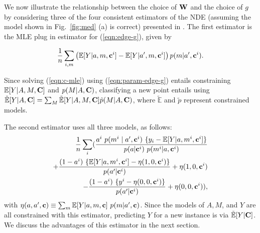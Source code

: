 \documentclass[letterpaper]{article} %
\newcommand{\citep}{\cite}
\begin{document}
We now illustrate the relationship between the choice of ${\bf W}$ and the choice of $g$ by considering three of the four consistent estimators of the NDE (assuming the model shown in Fig.~\ref{fig:med} (a) is correct) presented in \citep{tchetgen12semi2}.  The first estimator is the MLE plug in estimator for (\ref{eqn:edge-g}), given by
\begin{small}
\begin{align}
\frac{1}{n} \sum_{i,m} \left( \mathbb{E}[Y | a,m,{\bf c}^i
] - \mathbb{E}[Y | a',m,{\bf c}^i%
] \right) %
p(m | a',{\bf c}^i%
). 
\label{eqn:param-edge-g}
\end{align}
\end{small}
Since solving (\ref{eqn:c-mle}) using (\ref{eqn:param-edge-g}) entails constraining $\mathbb{E}[Y | A, M, {\bf C}]$ and $p(M | A, {\bf C})$, classifying a new point entails using
$\tilde{\mathbb{E}}[Y | A,{\bf C}%
] = \sum_M \tilde{\mathbb{E}}[Y | A,M,{\bf C}%
] \tilde{p}(M | A,{\bf C}%
)$, where $\tilde{\mathbb{E}}$ and $\tilde{p}$ represent constrained models.

The second estimator uses all three models, as follows:
{\footnotesize
\begin{align}
\notag
\label{eqn:3-robust}
\frac{1}{n} \sum_i (
\frac{ a^i \ p(m^i \mid a',{\bf c}^i) \ \{ y_i - \mathbb{E}[Y | a,m^i,{\bf c}^i ] \}
}{ p(a|{\bf c}^i) \
	p(m^i | a,{\bf c}^i)}\\
\notag
+ \frac{(1 - a^i) \ \{ \mathbb{E}[Y | a,m^i,{\bf c}^i] - \eta(1,0,{\bf c}^i) \}
	}{p(a' | {\bf c}^i)}  + \eta(1,0,{\bf c}^i)\\
- \frac{(1-a^i)\ \{ y^i - \eta(0,0,{\bf c}^i) \} }{p(a' | {\bf c}^i %
)} +
	\eta(0,0,{\bf c}^i )), 
\end{align}
}
with 
$\eta(a,a',{\bf c}) \equiv \sum_m \mathbb{E}[Y | a,m,{\bf c}] \ p(m | a',{\bf c})$.
Since the models of $A,M$, and $Y$ are all constrained with this estimator, predicting $Y$ for a new instance is via $\tilde{\mathbb{E}}[Y | {\bf C}]$.
We discuss the advantages of this estimator in the next section.
\end{document}
